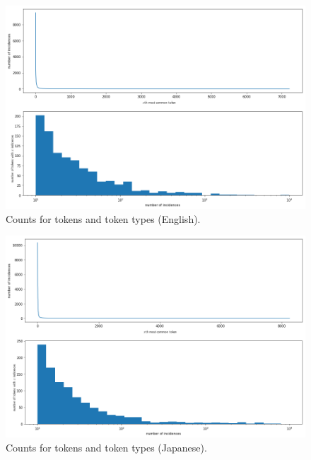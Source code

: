 \documentclass[answers]{exam}
\begin{document}
\begin{CJK}{UTF8}{min}
\begin{figure}
  \centering
  \includegraphics[width=\linewidth]{fig-toks-en}
  \caption{Counts for tokens and token types (English).}
  \label{fig:toks-en}
\end{figure}

\begin{figure}
  \centering
  \includegraphics[width=\linewidth]{fig-toks-fr}
  \caption{Counts for tokens and token types (Japanese).}
  \label{fig:toks-fr}
\end{figure}


\end{CJK}
\end{document}
